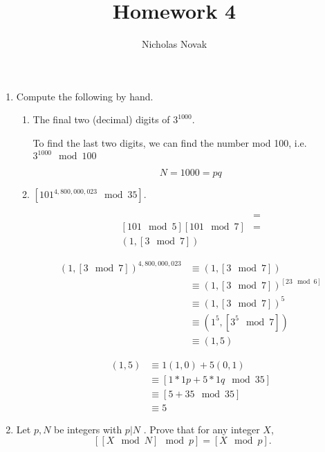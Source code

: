 \documentclass{article}
\title{Homework 4}
\date{}
\author{Nicholas Novak}
\begin{document}
\maketitle

\begin{enumerate}
  \item Compute the following by hand.
    \begin{enumerate}
      \item The final two (decimal) digits of $3^{1000}$.

        To find the last two digits, we can find the number mod 100, i.e.
        $3^{1000} \mod 100$

        \[
          N = 1000 = pq
        \]

      \item $[101^{4,800,000,023} \mod 35]$.

        \begin{align*}
          [101^{4,800,000,023} \mod 35] &=\\
          [101 \mod 5][101 \mod 7] &=\\
          (1, [3 \mod 7])
        \end{align*}

        \begin{align*}
          (1, [3 \mod 7])^{4,800,000,023} &\equiv (1, [3 \mod 7])\\
                                          &\equiv (1, [3 \mod 7])^{[23 \mod
                                          6]}\\
                                          &\equiv (1, [3 \mod 7])^5\\
                                          &\equiv (1^5, [3^5 \mod 7])\\
                                          &\equiv (1, 5)
        \end{align*}

        \begin{align*}
          (1, 5) &\equiv 1(1, 0) + 5(0, 1)\\
                 &\equiv [1 * 1p + 5 * 1q \mod 35]\\
                 &\equiv [5 + 35 \mod 35]\\
                 &\equiv \boxed{5}
        \end{align*}

    \end{enumerate}
  \item Let $p, N$ be integers with $p | N$ . Prove that for any integer $X$,
    \[
      [[X \mod N ] \mod p ] = [X \mod p ].
    \]


\end{enumerate}
\end{document}
